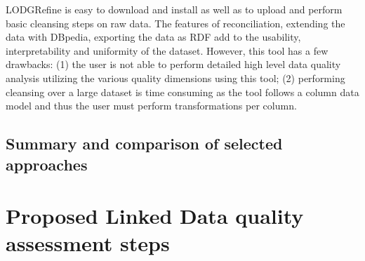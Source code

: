 LODGRefine is easy to download and install as well as to upload and perform basic cleansing steps on raw data.
The features of reconciliation, extending the data with DBpedia, exporting the data as RDF add to the usability, interpretability and uniformity of the dataset.
However, this tool has a few drawbacks: (1) the user is not able to perform detailed high level data quality analysis utilizing the various quality dimensions using this tool; (2) performing cleansing over a large dataset is time consuming as the tool follows a column data model and thus the user must perform transformations per column.
 
\subsection{Summary and comparison of selected approaches}

\section{Proposed Linked Data quality assessment steps}
%
%

